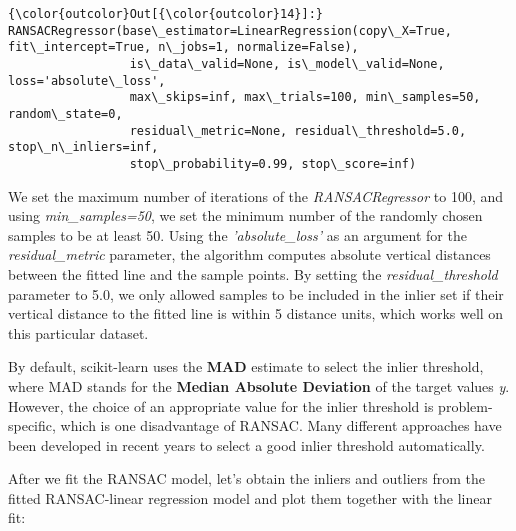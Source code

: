 \documentclass[11pt]{article}
\begin{document}
\begin{Verbatim}[commandchars=\\\{\}]
{\color{outcolor}Out[{\color{outcolor}14}]:} RANSACRegressor(base\_estimator=LinearRegression(copy\_X=True, fit\_intercept=True, n\_jobs=1, normalize=False),
                 is\_data\_valid=None, is\_model\_valid=None, loss='absolute\_loss',
                 max\_skips=inf, max\_trials=100, min\_samples=50, random\_state=0,
                 residual\_metric=None, residual\_threshold=5.0, stop\_n\_inliers=inf,
                 stop\_probability=0.99, stop\_score=inf)
\end{Verbatim}
            
    We set the maximum number of iterations of the \emph{RANSACRegressor} to
100, and using \emph{min\_samples=50}, we set the minimum number of the
randomly chosen samples to be at least 50. Using the
\emph{'absolute\_loss'} as an argument for the \emph{residual\_metric}
parameter, the algorithm computes absolute vertical distances between
the fitted line and the sample points. By setting the
\emph{residual\_threshold} parameter to 5.0, we only allowed samples to
be included in the inlier set if their vertical distance to the fitted
line is within 5 distance units, which works well on this particular
dataset.

By default, scikit-learn uses the \textbf{MAD} estimate to select the
inlier threshold, where MAD stands for the \textbf{Median Absolute
Deviation} of the target values \emph{y}. However, the choice of an
appropriate value for the inlier threshold is problem-specific, which is
one disadvantage of RANSAC. Many different approaches have been
developed in recent years to select a good inlier threshold
automatically.

After we fit the RANSAC model, let's obtain the inliers and outliers
from the fitted RANSAC-linear regression model and plot them together
with the linear fit:
\end{document}
